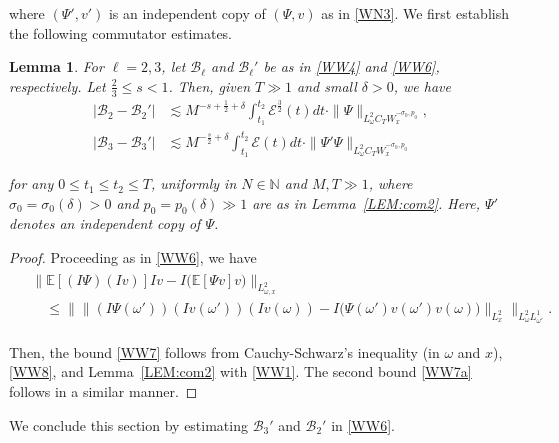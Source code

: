 \documentclass[letterpaper, 11pt,  reqno]{amsart}
\newtheorem{lemma}[theorem]{Lemma}
\newcommand{\1}{\hspace{0.5mm}\text{I}\hspace{0.2mm}}
\newcommand{\noi}{\noindent}
\newcommand{\N}{\mathbb{N}}
\newcommand{\E}{\mathbb{E}}
\newcommand{\om}{\omega}
\newcommand{\dl}{\delta}
\newcommand{\les}{\lesssim}
\newcommand{\EE}{\mathcal{E}}
\newcommand{\B}{\mathcal{B}}
\renewcommand{\o}{\omega}
\renewcommand{\l}{\ell}
\numberwithin{equation}{section}
\numberwithin{theorem}{section}
\begin{document}
\noi
\noi
where  $(\Psi', v')$ is an independent copy of $(\Psi, v)$
as in \eqref{WN3}.
We first establish  the following commutator estimates.


\begin{lemma}
\label{LEM:CM2}
For $\l = 2, 3$, 
let $\B_\l$ and $\B_\l'$ be as in \eqref{WW4} and \eqref{WW6}, respectively.
Let $\frac 23 \le s < 1$.
 Then, given $T \gg 1$ and small $\dl > 0$, we have
\begin{align} 
| \B_2 - \B_2' | 
& \les
 M^{- s + \frac 12 + \dl} 
  \int_{t_1}^{t_2} 
\EE ^{\frac 32} (t) d t
\cdot \| \Psi \|_{L_\om^2 C_T W_x^{- \sigma_0, p_0}} , 
\label{WW7}\\
| \B_3 - \B_3' | 
& \les M^{- \frac {s}{2} + \dl} 
\int_{t_1}^{t_2} \EE(t) d t 
\cdot \| \Psi' \Psi \|_{L_\om^2 C_T W_x^{- \sigma_0, p_0}} 
\label{WW7a}
\end{align}


\noi
for any 
$0 \le t_1 \le t_2 \le T$, 
uniformly in 
$N \in \N$ and  $M,  T \gg 1$, 
where
$\sigma_0 = \sigma_0 (\dl) >0$ and $p_0 = p_0 (\dl) \gg 1$ are as  in Lemma~\ref{LEM:com2}.
Here, $\Psi'$ denotes an independent copy of $\Psi$.

\end{lemma}


\begin{proof} 
Proceeding as in \eqref{WW6}, we have 
\begin{align}
\begin{split}
& \big\|\E [ (I \Psi)( I v) ] I v
-  I \big( \E [\Psi v] v \big)\big\|_{L^2_{\o, x}}\\
& \quad
\le \Big\|
\|
 (I \Psi (\o'))( I v(\o')) ( I v(\o))
-  I \big( \Psi(\o')  v(\o')  v(\o) \big) \|_{L^2_x}\Big\|_{L^2_{\o} L^1_{\o'}}.
\end{split}
\label{WW8}
\end{align}

\noi
Then, 
the  bound \eqref{WW7} follows 
from
Cauchy-Schwarz's inequality (in $\o$ and $x$), 
\eqref{WW8}, 
and Lemma~\ref{LEM:com2}
with \eqref{WW1}.
The second bound \eqref{WW7a}
follows in a similar manner.
\end{proof}  










We conclude this section by estimating 
$\B_3'$
and $\B_2'$ in \eqref{WW6}.
\end{document}
